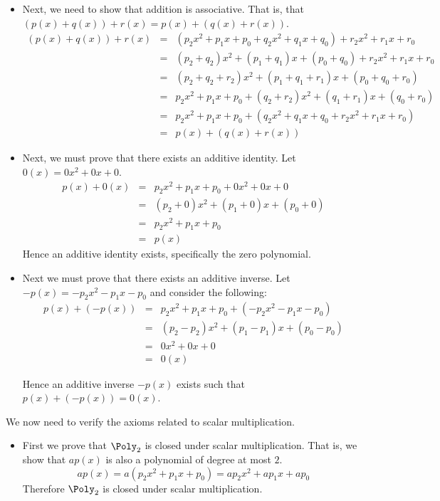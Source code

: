 \begin{solution}
\begin{itemize}
\item
Next, we need to show that addition is associative. That is, that $(p(x) + q(x)) + r(x) = p(x) + (q(x)+r(x))$. 
\begin{eqnarray*}
(p(x) + q(x)) + r(x) &=& (p_2x^2 +p_1x + p_0 + q_2x^2 + q_1x + q_0) + r_2x^2 +r_1x + r_0 \\
&=&  (p_2+q_2)x^2 + (p_1+q_1)x + (p_0 +q_0) + r_2x^2 + r_1x + r_0\\
&=&  (p_2+q_2+r_2)x^2 + (p_1+q_1+r_1)x + (p_0+q_0+r_0)  \\
&=&  p_2x^2 + p_1x + p_0 +  (q_2+r_2)x^2 + (q_1+r_1)x + (q_0+r_0)  \\
&=&  p_2x^2 + p_1x + p_0 + (q_2x^2 +q_1x + q_0 + r_2x^2 + r_1x + r_0)\\
&=& p(x) + (q(x) + r(x))
\end{eqnarray*}

\item
Next, we must prove that there exists an additive identity. Let $0(x)=0x^2+0x+0$. 
\begin{eqnarray*}
p(x) + 0(x)  &=&  p_2x^2 + p_1x + p_0 + 0x^2 + 0x + 0 \\
&=&  (p_2 + 0)x^2  + (p_1 + 0)x + (p_0 + 0)\\
&=&  p_2x^2 + p_1x + p_0 \\
&=& p(x)
\end{eqnarray*}
Hence an additive identity exists, specifically the zero polynomial. 

\item 
Next we must prove that there exists an additive inverse. Let $-p(x) = -p_2x^2 - p_1x - p_0$ and consider the following:
\begin{eqnarray*}
p(x) + (-p(x)) &=&   p_2x^2 + p_1x + p_0 + (- p_2x^2  - p_1x - p_0) \\
&=& (p_2 - p_2)x^2  + (p_1 - p_1)x + (p_0 - p_0) \\
&=& 0x^2 + 0x + 0 \\
&=& 0(x)
\end{eqnarray*}

Hence an additive inverse $-p(x)$ exists such that $p(x) + (-p(x)) = 0(x)$. 
\end{itemize} 

We now need to verify the axioms related to scalar multiplication. 
\begin{itemize}
\item
First we prove that $\Poly_2$ is closed under scalar multiplication. That is, we show that $ap(x)$ is also a polynomial of degree at most $2$. 
\[
ap(x) = a(p_2x^2 + p_1x + p_0) = ap_2x^2 +ap_1x+ ap_0
\]
Therefore $\Poly_2$ is closed under scalar multiplication. 


\end{itemize}
\end{solution}

